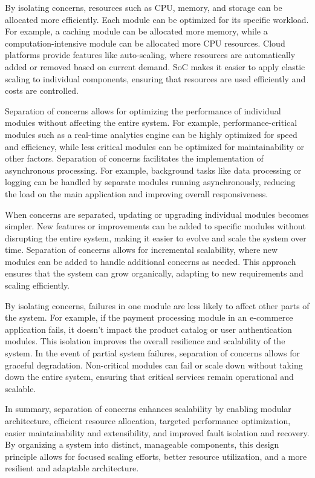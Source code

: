 \par
By isolating concerns, resources such as CPU, memory, and storage can be allocated more efficiently.
Each module can be optimized for its specific workload.
For example, a caching module can be allocated more memory, while a computation-intensive module can be allocated more CPU resources.
Cloud platforms provide features like auto-scaling, where resources are automatically added or removed based on current demand.
SoC makes it easier to apply elastic scaling to individual components, ensuring that resources are used efficiently and costs are controlled.
\par
Separation of concerns allows for optimizing the performance of individual modules without affecting the entire system.
For example, performance-critical modules such as a real-time analytics engine can be highly optimized for speed and efficiency, while less critical modules can be optimized for maintainability or other factors.
Separation of concerns facilitates the implementation of asynchronous processing.
For example, background tasks like data processing or logging can be handled by separate modules running asynchronously, reducing the load on the main application and improving overall responsiveness.
\par
When concerns are separated, updating or upgrading individual modules becomes simpler.
New features or improvements can be added to specific modules without disrupting the entire system, making it easier to evolve and scale the system over time.
Separation of concerns allows for incremental scalability, where new modules can be added to handle additional concerns as needed.
This approach ensures that the system can grow organically, adapting to new requirements and scaling efficiently.
\par
By isolating concerns, failures in one module are less likely to affect other parts of the system.
For example, if the payment processing module in an e-commerce application fails, it doesn't impact the product catalog or user authentication modules.
This isolation improves the overall resilience and scalability of the system.
In the event of partial system failures, separation of concerns allows for graceful degradation.
Non-critical modules can fail or scale down without taking down the entire system, ensuring that critical services remain operational and scalable.
\par
In summary, separation of concerns enhances scalability by enabling modular architecture, efficient resource allocation, targeted performance optimization, easier maintainability and extensibility, and improved fault isolation and recovery.
By organizing a system into distinct, manageable components, this design principle allows for focused scaling efforts, better resource utilization, and a more resilient and adaptable architecture.


